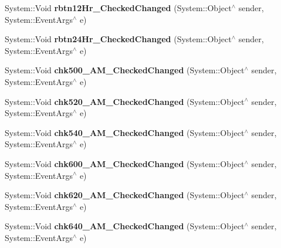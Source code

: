 \begin{DoxyCompactItemize}
\mbox{\label{class_project1_1_1_my_form_af69b9a7f82209c957cb8bd3dbae81b96}} 
System\+::\+Void {\bfseries rbtn12\+Hr\+\_\+\+Checked\+Changed} (System\+::\+Object$^\wedge$ sender, System\+::\+Event\+Args$^\wedge$ e)
\item 
\mbox{\label{class_project1_1_1_my_form_a35718b01501bf8394e3859e3e34d4bce}} 
System\+::\+Void {\bfseries rbtn24\+Hr\+\_\+\+Checked\+Changed} (System\+::\+Object$^\wedge$ sender, System\+::\+Event\+Args$^\wedge$ e)
\item 
\mbox{\label{class_project1_1_1_my_form_a4b99ec7ea2c8cec1202faf96fce14e68}} 
System\+::\+Void {\bfseries chk500\+\_\+A\+M\+\_\+\+Checked\+Changed} (System\+::\+Object$^\wedge$ sender, System\+::\+Event\+Args$^\wedge$ e)
\item 
\mbox{\label{class_project1_1_1_my_form_a19b469da3814ffe5b239203fb0a08d0d}} 
System\+::\+Void {\bfseries chk520\+\_\+A\+M\+\_\+\+Checked\+Changed} (System\+::\+Object$^\wedge$ sender, System\+::\+Event\+Args$^\wedge$ e)
\item 
\mbox{\label{class_project1_1_1_my_form_abd5557c4171004918d5a9837d4d0d98a}} 
System\+::\+Void {\bfseries chk540\+\_\+A\+M\+\_\+\+Checked\+Changed} (System\+::\+Object$^\wedge$ sender, System\+::\+Event\+Args$^\wedge$ e)
\item 
\mbox{\label{class_project1_1_1_my_form_ada3afb697452917d898d313e59998199}} 
System\+::\+Void {\bfseries chk600\+\_\+A\+M\+\_\+\+Checked\+Changed} (System\+::\+Object$^\wedge$ sender, System\+::\+Event\+Args$^\wedge$ e)
\item 
\mbox{\label{class_project1_1_1_my_form_ad253604c18d620ac230925b58fb3fde1}} 
System\+::\+Void {\bfseries chk620\+\_\+A\+M\+\_\+\+Checked\+Changed} (System\+::\+Object$^\wedge$ sender, System\+::\+Event\+Args$^\wedge$ e)
\item 
\mbox{\label{class_project1_1_1_my_form_a6ad6bf94b4a907dc75340f6d5dc811fd}} 
System\+::\+Void {\bfseries chk640\+\_\+A\+M\+\_\+\+Checked\+Changed} (System\+::\+Object$^\wedge$ sender, System\+::\+Event\+Args$^\wedge$ e)

\end{DoxyCompactItemize}

